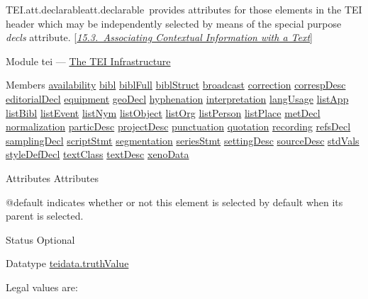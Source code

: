 \begin{reflist}
\item[]\begin{specHead}{TEI.att.declarable}{att.declarable} provides attributes for those elements in the TEI header which may be independently selected by means of the special purpose {\itshape decls} attribute. [\textit{\hyperref[CCAS]{15.3.\ Associating Contextual Information with a Text}}]\end{specHead} 
    \item[{Module}]
  tei — \hyperref[ST]{The TEI Infrastructure}
    \item[{Members}]
  \hyperref[TEI.availability]{availability} \hyperref[TEI.bibl]{bibl} \hyperref[TEI.biblFull]{biblFull} \hyperref[TEI.biblStruct]{biblStruct} \hyperref[TEI.broadcast]{broadcast} \hyperref[TEI.correction]{correction} \hyperref[TEI.correspDesc]{correspDesc} \hyperref[TEI.editorialDecl]{editorialDecl} \hyperref[TEI.equipment]{equipment} \hyperref[TEI.geoDecl]{geoDecl} \hyperref[TEI.hyphenation]{hyphenation} \hyperref[TEI.interpretation]{interpretation} \hyperref[TEI.langUsage]{langUsage} \hyperref[TEI.listApp]{listApp} \hyperref[TEI.listBibl]{listBibl} \hyperref[TEI.listEvent]{listEvent} \hyperref[TEI.listNym]{listNym} \hyperref[TEI.listObject]{listObject} \hyperref[TEI.listOrg]{listOrg} \hyperref[TEI.listPerson]{listPerson} \hyperref[TEI.listPlace]{listPlace} \hyperref[TEI.metDecl]{metDecl} \hyperref[TEI.normalization]{normalization} \hyperref[TEI.particDesc]{particDesc} \hyperref[TEI.projectDesc]{projectDesc} \hyperref[TEI.punctuation]{punctuation} \hyperref[TEI.quotation]{quotation} \hyperref[TEI.recording]{recording} \hyperref[TEI.refsDecl]{refsDecl} \hyperref[TEI.samplingDecl]{samplingDecl} \hyperref[TEI.scriptStmt]{scriptStmt} \hyperref[TEI.segmentation]{segmentation} \hyperref[TEI.seriesStmt]{seriesStmt} \hyperref[TEI.settingDesc]{settingDesc} \hyperref[TEI.sourceDesc]{sourceDesc} \hyperref[TEI.stdVals]{stdVals} \hyperref[TEI.styleDefDecl]{styleDefDecl} \hyperref[TEI.textClass]{textClass} \hyperref[TEI.textDesc]{textDesc} \hyperref[TEI.xenoData]{xenoData}
    \item[{Attributes}]
  Attributes\hfil\\[-10pt]\begin{sansreflist}
    \item[@default]
  indicates whether or not this element is selected by default when its parent is selected.
\begin{reflist}
    \item[{Status}]
  Optional
    \item[{Datatype}]
  \hyperref[TEI.teidata.truthValue]{teidata.truthValue}
    \item[{Legal values are:}]
  \begin{description}


\end{description}
\end{reflist}
\end{sansreflist}
\end{reflist}
